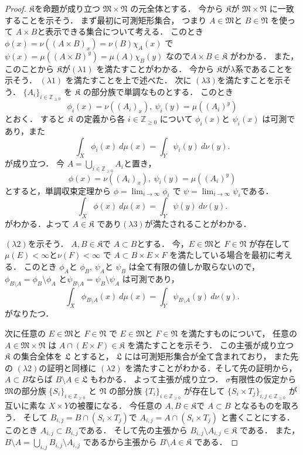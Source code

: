 \documentclass[leqno, a4paper, 12pt]{jsarticle}
\newcommand{\zz}{\mathbb{Z}}
\begin{document}
\begin{proof}
$\mathfrak{K}$を命題が成り立つ
$\mathfrak{M}\times \mathfrak{N}$
の元全体とする．
今から
$\mathfrak{K}$が
$\mathfrak{M}\times \mathfrak{N}$
に一致することを示そう．
まず最初に可測矩形集合，
つまり
$A\in \mathfrak{M}$と
$B\in \mathfrak{N}$
を使って
$A\times B$と表示できる集合について考える．
このとき
$\phi(x)=\nu((A\times B)_{x})=\nu(B)\chi_{A}(x)$
で
$\psi(x)=\mu((A\times B)^{y})=\mu(A)\chi_{B}(y)$
なので$A\times B\in \mathfrak{K}$
がわかる．
また，このことから
$\mathfrak{K}$が$(\lambda1)$
を満たすことがわかる．
今から
$\mathfrak{K}$が$\lambda$系であることを示そう．
$(\lambda1)$
を満たすことを上で述べた．
次に
$(\lambda3)$を満たすことを示そう．
$\{A_{i}\}_{i\in \zz_{\ge 0}}$
を
$\mathfrak{K}$
の部分族で単調なものとする．
このとき
\[
\phi_{i}(x)=\nu((A_{i})_{x}), \ \psi_{i}(y)=\mu((A_{i})^{y})
\]
とおく．
すると
$\mathfrak{K}$
の定義から各
$i\in \zz_{\ge 0}$
について
$\phi_{i}(x)$と
$\psi_{i}(x)$
は可測であり，また
\[
\int_{X}\phi_{i}(x)\ d\mu(x)=\int_{Y}\psi_{i}(y)\ d\nu(y). 
\]
が成り立つ．
今
$A=\bigcup_{i\in \zz_{\ge 0}}A_{i}$と置き，
\[
\phi(x)=\nu((A_{i})_{x}), \ \psi_{i}(y)=\mu((A_{i})^{y})
\]
とすると，単調収束定理から
$\phi=\lim_{i\to \infty}\phi_{i}$
で
$\psi=\lim_{i\to \infty}\psi_{i}$である．
\[
\int_{X}\phi(x)\ d\mu(x)=\int_{Y}\psi(y)\ d\nu(y). 
\]
がわかる．よって
$A\in \mathfrak{K}$
であり$(\lambda3)$が満たされることがわかる．

$(\lambda2)$を示そう．
$A, B\in \mathfrak{K}$で
$A\subset B$とする．
今，$E\in \mathfrak{M}$と
$F\in \mathfrak{N}$
が存在して
$\mu(E)<\infty$と$\nu(F)<\infty$
で
$A\subset B\times E\times F$
を満たしている場合を最初に考える．
このとき
$\phi_{A}$と
$\phi_{B}$, 
$\psi_{A}$と
$\psi_{B}$
は全て有限の値しか取らないので，
$\phi_{B\setminus A}=\phi_{B}\setminus \phi_{A}$
と$\psi_{B\setminus A}=\psi_{B}\setminus \psi_{A}$
は可測であり，
\[
\int_{X}\phi_{B\setminus A}(x)\ d\mu(x)=
\int_{Y}\psi_{B\setminus A}(y)\ d\nu(y). 
\]
がなりたつ．

次に任意の
$E\in \mathfrak{M}$と
$F\in \mathfrak{N}$
で
$E\in \mathfrak{M}$と
$F\in \mathfrak{N}$
を満たすものについて，
任意の
$A\in \mathfrak{M}\times \mathfrak{N}$
は
$A\cap (E\times F)\in \mathfrak{K}$
を満たすことを示そう．
この主張が成り立つ
$\mathfrak{K}$
の集合全体を
$\mathfrak{L}$
とすると，
$\mathfrak{L}$
には可測矩形集合が全て含まれており，
また先の
$(\lambda2)$の証明と同様に
$(\lambda2)$
を満たすことがわかる．そして先の証明から，
$A\subset B$ならば
$B\setminus A\in \mathfrak{L}$
もわかる．
よって主張が成り立つ．
$\sigma$有限性の仮定から
$\mathfrak{M}$の部分族
$\{S_{i}\}_{i\in \zz_{\ge 0}}$
と
$\mathfrak{N}$
の部分族
$\{T_{i}\}_{i\in \zz_{\ge 0}}$
が存在して
$\{S_{i}\times T_{j}\}_{i, j\in \zz_{\ge 0}}$
が互いに素な
$X\times Y$の被覆になる．
今任意の
$A, B\in \mathfrak{K}$で
$A\subset B$
となるものを取ろう．
そして
$B_{i, j}=B\cap (S_{i}\times T_{j})$で
$A_{i, j}=A\cap (S_{i}\times T_{j})$
と書くことにする．
このとき
$A_{i, j}\subset B_{i, j}$である．
そして先の主張から
$B_{i,j}\setminus A_{i, j}\in \mathfrak{K}$
である．
また，
$B\setminus A=\bigcup_{i, j}B_{i, j}\setminus A_{i, j}$
であるから主張から
$B\setminus A\in \mathfrak{K}$
である．


\end{proof}
\end{document}

